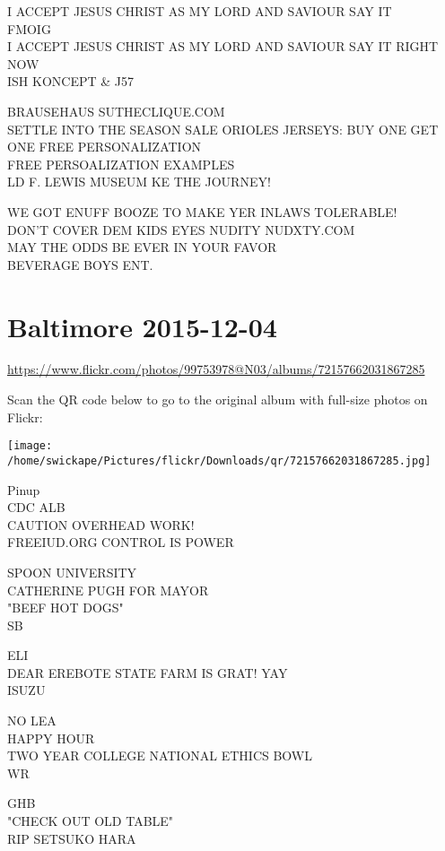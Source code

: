 \documentclass[10pt,letterpaper]{article}
\begin{document}
I ACCEPT JESUS CHRIST AS MY LORD AND SAVIOUR SAY IT\\
FMOIG\\
I ACCEPT JESUS CHRIST AS MY LORD AND SAVIOUR SAY IT RIGHT NOW\\
ISH KONCEPT \& J57

BRAUSEHAUS SUTHECLIQUE.COM\\
SETTLE INTO THE SEASON SALE ORIOLES JERSEYS: BUY ONE GET ONE FREE PERSONALIZATION\\
FREE PERSOALIZATION EXAMPLES\\
LD F. LEWIS MUSEUM KE THE JOURNEY!

WE GOT ENUFF BOOZE TO MAKE YER INLAWS TOLERABLE!\\
DON'T COVER DEM KIDS EYES NUDITY NUDXTY.COM\\
MAY THE ODDS BE EVER IN YOUR FAVOR\\
BEVERAGE BOYS ENT.


\section*{Baltimore 2015-12-04}

\url{https://www.flickr.com/photos/99753978@N03/albums/72157662031867285}

Scan the QR code below to go to the original album with full-size photos on Flickr:

\texttt{[image: /home/swickape/Pictures/flickr/Downloads/qr/72157662031867285.jpg]}


Pinup\\
CDC ALB\\
CAUTION OVERHEAD WORK!\\
FREEIUD.ORG CONTROL IS POWER

SPOON UNIVERSITY\\
CATHERINE PUGH FOR MAYOR\\
"BEEF HOT DOGS"\\
SB

ELI\\
DEAR EREBOTE STATE FARM IS GRAT!  YAY\\
ISUZU

NO LEA\\
HAPPY HOUR\\
TWO YEAR COLLEGE NATIONAL ETHICS BOWL\\
WR

GHB\\
"CHECK OUT OLD TABLE"\\
RIP SETSUKO HARA
\end{document}
